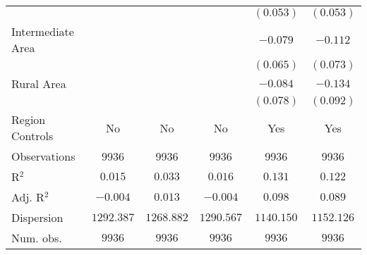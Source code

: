 \begin{center}
\begin{tiny}
\begin{longtable}{l@{} c@{} c@{} c@{} c@{} c@{}}
                                                      &                 &                  &                 & $(0.053)$        & $(0.053)$        \\
\quad Intermediate Area                               &                 &                  &                 & $-0.079$         & $-0.112$         \\
                                                      &                 &                  &                 & $(0.065)$        & $(0.073)$        \\
\quad Rural Area                                      &                 &                  &                 & $-0.084$         & $-0.134$         \\
                                                      &                 &                  &                 & $(0.078)$        & $(0.092)$        \\
\hline
Region Controls                                       & No              & No               & No              & Yes              & Yes              \\
Observations                                          & 9936            & 9936             & 9936            & 9936             & 9936             \\
R$^2$                                                 & $0.015$         & $0.033$          & $0.016$         & $0.131$          & $0.122$          \\
Adj. R$^2$                                            & $-0.004$        & $0.013$          & $-0.004$        & $0.098$          & $0.089$          \\
Dispersion                                            & $1292.387$      & $1268.882$       & $1290.567$      & $1140.150$       & $1152.126$       \\
Num. obs.                                             & $9936$          & $9936$           & $9936$          & $9936$           & $9936$           \\
\end{longtable}
\end{tiny}
\end{center}
